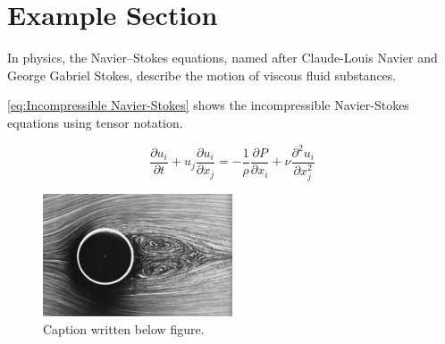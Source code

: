 \section{Example Section}

In physics, the Navier–Stokes equations, named after Claude-Louis Navier and George Gabriel Stokes, describe the motion of viscous fluid substances.

\eqref{eq:Incompressible Navier-Stokes} shows the incompressible Navier-Stokes equations using tensor notation.

\begin{equation}
    \frac{\partial u_i}{\partial t} + u_j \frac{\partial u_i}{\partial x_j} = -\frac{1}{\rho} \frac{\partial P}{\partial x_i} + \nu \frac{\partial^2 u_i}{\partial x_j^2}
    \label{eq:Incompressible Navier-Stokes}
\end{equation}

\begin{figure}[H]
    \centering
    \includegraphics[width=0.5\textwidth]{Images/CylinderImage.jpg}
    \caption[Caption used in list of tables]{Caption written below figure.}
    \label{fig:flow around cylinder}
\end{figure}

